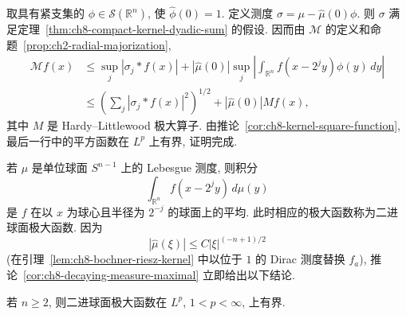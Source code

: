 \hypertarget{chapter-08-page-190}{}
\begin{Proof}
取具有紧支集的 $\phi\in\mathcal S(\mathbb R^n)$, 使 $\widehat\phi(0)=1$. 定义测度 $\sigma=\mu-\widehat\mu(0)\phi$. 则 $\sigma$ 满足定理~\ref{thm:ch8-compact-kernel-dyadic-sum} 的假设. 因而由 $\mathcal M$ 的定义和命题~\ref{prop:ch2-radial-majorization},
\[
 \begin{aligned}
 \mathcal Mf(x)
 &\le\sup_j|\sigma_j*f(x)|
 +|\widehat\mu(0)|\sup_j\left|\int_{\mathbb R^n}f(x-2^jy)\phi(y)\,dy\right|\\
 &\le\left(\sum_j|\sigma_j*f(x)|^2\right)^{1/2}
 +|\widehat\mu(0)|Mf(x),
 \end{aligned}
\]
其中 $M$ 是 Hardy--Littlewood 极大算子. 由推论~\ref{cor:ch8-kernel-square-function}, 最后一行中的平方函数在 $L^p$ 上有界, 证明完成.
\end{Proof}

若 $\mu$ 是单位球面 $S^{n-1}$ 上的 Lebesgue 测度, 则积分
\[
 \int_{\mathbb R^n}f(x-2^jy)\,d\mu(y)
\]
是 $f$ 在以 $x$ 为球心且半径为 $2^{-j}$ 的球面上的平均. 此时相应的极大函数称为二进球面极大函数. 因为
\[
 |\widehat\mu(\xi)|\le C|\xi|^{(-n+1)/2}
\]
(在引理~\ref{lem:ch8-bochner-riesz-kernel} 中以位于 $1$ 的 Dirac 测度替换 $f_a$), 推论~\ref{cor:ch8-decaying-measure-maximal} 立即给出以下结论.

\begin{Corollary}
\label{cor:ch8-dyadic-spherical-maximal}
若 $n\ge2$, 则二进球面极大函数在 $L^p$, $1<p<\infty$, 上有界.
\end{Corollary}
